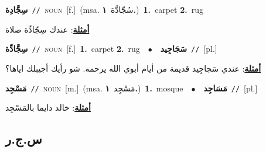 \documentclass[10pt,a4paper,twoside]{article} %
\begin{document}
\begin{multicols}{2}
{\setlength\topsep{0pt}\textbf{\foreignlanguage{arabic}{سِجَّادِة}}\ {\color{gray}\texttt{//}\color{black}}\ \textsc{noun}\ [f.]\ \color{gray}(msa. \foreignlanguage{arabic}{سُجّادَّة}~\foreignlanguage{arabic}{\textbf{١.}})\color{black}\ \textbf{1.}~carpet  \textbf{2.}~rug\  \begin{flushright}\color{gray}\foreignlanguage{arabic}{\textbf{\underline{\foreignlanguage{arabic}{أمثلة}}}: عندك سِجّادِّة صلاة}\end{flushright}\color{black}} \vspace{2mm}

{\setlength\topsep{0pt}\textbf{\foreignlanguage{arabic}{سِجَّادِّة}}\ {\color{gray}\texttt{//}\color{black}}\ \textsc{noun}\ [f.]\ \textbf{1.}~carpet  \textbf{2.}~rug\ \ $\bullet$\ \ \setlength\topsep{0pt}\textbf{\foreignlanguage{arabic}{سَجَاجِيد}}\ {\color{gray}\texttt{//}\color{black}}\ [pl.]\  \begin{flushright}\color{gray}\foreignlanguage{arabic}{\textbf{\underline{\foreignlanguage{arabic}{أمثلة}}}: عندي سَجاجِيد قديمة من أيام أبوي الله يرحمه. شو رأيك أجيبلك اياها؟}\end{flushright}\color{black}} \vspace{2mm}

{\setlength\topsep{0pt}\textbf{\foreignlanguage{arabic}{مَسْجِد}}\ {\color{gray}\texttt{//}\color{black}}\ \textsc{noun}\ [m.]\ \color{gray}(msa. \foreignlanguage{arabic}{مَسْجِد}~\foreignlanguage{arabic}{\textbf{١.}})\color{black}\ \textbf{1.}~mosque\ \ $\bullet$\ \ \setlength\topsep{0pt}\textbf{\foreignlanguage{arabic}{مَسَاجِد}}\ {\color{gray}\texttt{//}\color{black}}\ [pl.]\  \begin{flushright}\color{gray}\foreignlanguage{arabic}{\textbf{\underline{\foreignlanguage{arabic}{أمثلة}}}: خالد دايما بالمَسْجِد}\end{flushright}\color{black}} \vspace{2mm}

\vspace{-3mm}
\subsection*{\color{blue}\foreignlanguage{arabic}{س.ج.ر}\color{blue}{}} 


\end{multicols}
\end{document}
